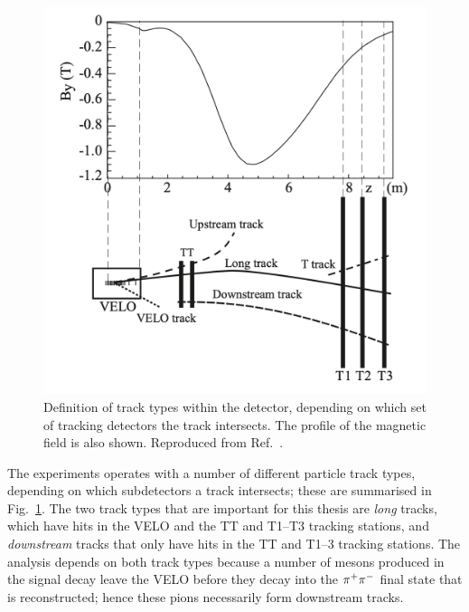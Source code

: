 \begin{figure}[tb]
    \centering
    \includegraphics[width=0.75\columnwidth]{figures/detector/track_types.png}
    \caption{Definition of track types within the \lhcb detector, depending on which set of tracking detectors the track intersects. The profile of the magnetic field  is also shown. Reproduced from Ref.~\cite{LHCb-Performance}.}
    \label{fig:track_types}
\end{figure}

The \lhcb experiments operates with a number of different particle track types, depending on which subdetectors a track intersects; these are summarised in Fig.~\ref{fig:track_types}. The two track types that are important for this thesis are \emph{long} tracks, which have hits in the VELO and the TT and T1--T3 tracking stations, and \emph{downstream} tracks that only have hits in the TT and T1--3 tracking stations. The analysis depends on both track types because a number of \KS mesons produced in the signal decay leave the VELO before they decay into the ${{\pi}^+}{{\pi}^-}$ final state that is reconstructed; hence these pions necessarily form downstream tracks.

